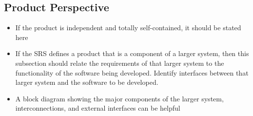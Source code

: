 \documentclass[]{article}
\begin{document}


\subsection{Product Perspective}
\label{sub:product_perspective}
\begin{itemize}


	\item If the product is independent and totally self-contained, it should be stated here
	\item If the SRS defines a product that is a component of a larger system, then this subsection should relate the requirements of that larger system to the functionality of the software being developed. Identify interfaces between that larger system and the software to be developed.
	\item A block diagram showing the major components of the larger system, interconnections, and external interfaces can be helpful
\end{itemize}
\end{document}
